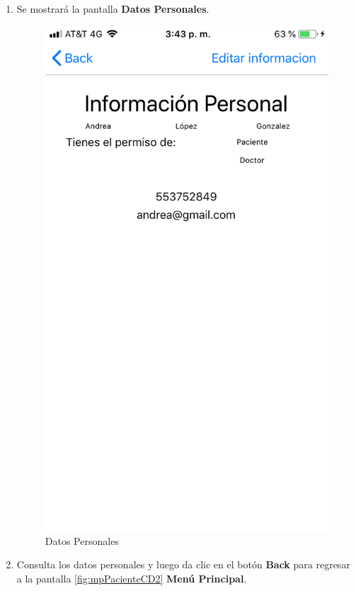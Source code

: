 \begin{enumerate}
	\item Se mostrará la pantalla \textbf{Datos Personales}. 
	\newpage
	\begin{figure}[!htbp]			
		\hypertarget{fig:DatosPersonales}{\hspace{1pt}}
		\begin{center}
			\includegraphics[height=0.4\textheight]{Paciente/ConsultarDP/images/DatosPersonales}
			\caption{Datos Personales}
			\label{fig:DatosPersonales}
		\end{center}
	\end{figure}

	\item Consulta los datos personales y luego da clic en el botón \textbf{Back} para regresar a la pantalla \ref{fig:mpPacienteCD2} \textbf{Menú Principal}.


\end{enumerate}

